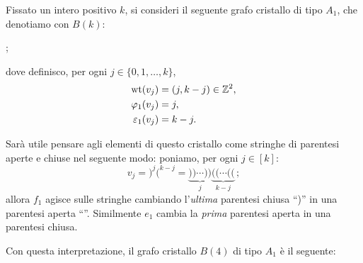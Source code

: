 \begin{example}
    \label{ex:crys_Bk_A1}
    Fissato un intero positivo $k$, si consideri il seguente grafo cristallo di tipo $A_1$,
    che denotiamo con $B(k)$:
    \begin{center}
        ;
    \end{center}
    dove definisco, per ogni $j \in \{0, 1, \dots, k \}$,
    \begin{align*}
        \operatorname{wt}(v_j) &= (j, k-j) \in \mathbb{Z}^2, \\
        \varphi_1(v_j) &= j, \\
        \varepsilon_1(v_j) &= k-j.
    \end{align*}

    Sar\`a utile pensare agli elementi di questo cristallo come stringhe di parentesi
    aperte e chiuse nel seguente modo:
    poniamo, per ogni $ j \in [k]$:
    \[
        v_j 
        {}={}
        )^j \lparen^{k-j} 
        {}={} 
        \underbrace{)) \cdots ))}_j
        \underbrace{\lparen\lparen \cdots \lparen\lparen}_{k-j}
        \,;
    \]
    allora $f_1$ agisce sulle stringhe cambiando l'\emph{ultima} parentesi
    chiusa ``)'' in una parentesi aperta ``\lparen''.
    Similmente $e_1$ cambia la \emph{prima} parentesi aperta in una parentesi
    chiusa.

    Con questa interpretazione, il grafo cristallo $B(4)$ di tipo $A_1$
    \`e il seguente:
    \begin{center}
    \end{center}

\end{example}

